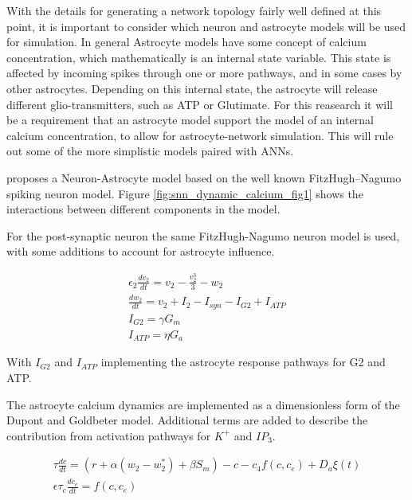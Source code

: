     With the details for generating a network topology fairly well defined at
    this point, it is important to consider which neuron and astrocyte models
    will be used for simulation. In general Astrocyte models have some concept
    of calcium concentration, which mathematically is an internal state
    variable. This state is affected by incoming spikes through one or more
    pathways, and in some cases by other astrocytes. Depending on this internal
    state, the astrocyte will release different glio-transmitters, such as ATP
    or Glutimate. For this reasearch it will be a requirement that an astrocyte
    model support the model of an internal calcium concentration, to allow for
    astrocyte-network simulation. This will rule out some of the more simplistic
    models paired with ANNs.
    
    \cite{snn_dynamic_calcium} proposes a Neuron-Astrocyte model based on the
    well known FitzHugh–Nagumo spiking neuron model. Figure
    \ref{fig:snn_dynamic_calcium_fig1} shows the interactions between different
    components in the model.
    
    
    For the post-synaptic neuron the same FitzHugh-Nagumo neuron model is used,
    with some additions to account for astrocyte influence.
    
    \begin{align}
        \epsilon_2 \frac{dv_2}{dt} = v_2 - \frac{v^3_2}{3} - w_2
        \\ \frac{dw_2}{dt} = v_2+I_2-I_{syn}-I_{G2}+I_{ATP} \\ I_{G2} = \gamma
        G_m \\ I_{ATP} = \eta G_a
    \end{align}
    
    With $I_{G2}$ and $I_{ATP}$ implementing the astrocyte response pathways for
    G2 and ATP.
    
    The astrocyte calcium dynamics are implemented as a dimensionless form of
    the Dupont and Goldbeter model. Additional terms are added to describe the
    contribution from activation pathways for $K^+$ and $IP_3$.
    
    \begin{align}
        \tau \frac{dc}{dt} = (r + \alpha(w_2 - w^*_2) + \beta S_m) - c - c_4
        f(c, c_e) + D_a \xi(t) \\ \epsilon \tau_c \frac{dc_e}{dt} = f(c, c_e)
    \end{align}
    
